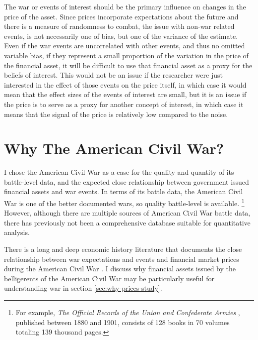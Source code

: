 The war or events of interest should be the primary influence on changes in the price of the asset.
Since prices incorporate expectations about the future and there is a measure of randomness to combat, the issue with non-war related events, is not necessarily one of bias, but one of the variance of the estimate.
Even if the war events are uncorrelated with other events, and thus no omitted variable bias, if they represent a small proportion of the variation in the price of the financial asset, it will be difficult to use that financial asset as a proxy for the beliefs of interest.
This would not be an issue if the researcher were just interested in the effect of those events on the price itself, in which case it would mean that the effect sizes of the events of interest are small, but it is an issue if the price is to serve as a proxy for another concept of interest, in which case it means that the signal of the price is relatively low compared to the noise.



\section{Why The American Civil War?}
\label{sec:why-american-civil}

I chose the American Civil War as a case for the quality and quantity of its battle-level data, and the expected close relationship between government issued financial assets and war events.
In terms of its battle data, the American Civil War is one of the better documented wars, so quality battle-level is available.%
\footnote{%
  For example, \textit{The Official Records of the Union and  Confederate Armies} \parencites{US1901}, published between 1880 and 1901, consists of 128 books in 70 volumes totaling 139 thousand pages. %
} %
However, although there are multiple sources of American Civil War battle data, there has previously not been a comprehensive database suitable for quantitative analysis.

There is a long and deep economic history literature that documents the close relationship between war expectations and events and financial market prices during the American Civil War \parencites{Mitchell1903}{Mitchell1908}{Calomiris1988}{WillardGuinnaneEtAl1996}{McCandless1996}{SmithSmith1997}{Schwab1901}{Weidenmier2002}{BurdekinLangdana1993}{DavisPecquet1990}{BrownBurdekin2000}{OosterlinckWeidenmier2007}{Roll1972}.
I discuss why financial assets issued by the belligerents of the American Civil War may be particularly useful for understanding war in section \ref{sec:why-prices-study}.

